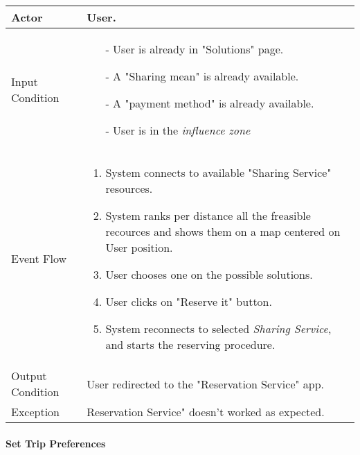 		\begin{tabular}{| l | p{} | }
			\hline
			\hline
			Actor	&		User. \\
			\hline
			Input Condition		&		\begin{itemize}
													\item[-] User is already in "Solutions" page.
													\item[-] A "Sharing mean" is already available.
													\item[-] A "payment method" is already available.
													\item[-] User is in the \textit{influence zone}
												\end{itemize} \\
			\hline
			Event Flow		&		\begin{enumerate}
												\item System connects to available "Sharing Service" resources.
												\item System ranks per distance all the freasible recources and shows them on a map centered on User position.
												\item User chooses one on the possible solutions.												
												\item User clicks on "Reserve it" button.
												\item	 System reconnects to selected \textit{Sharing Service}, and starts the reserving procedure.
											\end{enumerate} \\
			\hline
			Output Condition		&		User redirected to the "Reservation Service" app. \\
			\hline		
			Exception		&		Reservation Service" doesn't worked as expected. \\
			\hline
			\hline
		\end{tabular}
		
		

	\paragraph{Set Trip Preferences}
	

